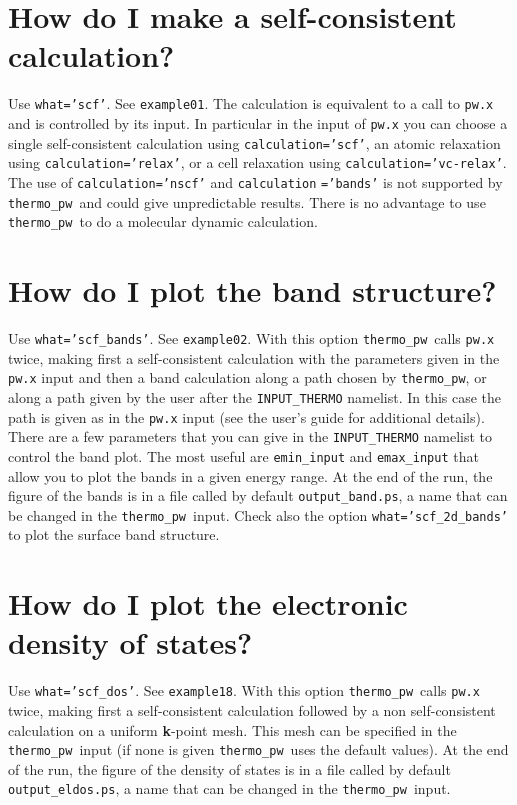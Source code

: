 \documentclass[12pt,a4paper]{article}
\def\thermo{\texttt{thermo\_pw}}
\begin{document}
\newpage
\section{\color{coral}How do I make a self-consistent calculation?}
Use \texttt{what='scf'}. See \texttt{example01}. The calculation is
equivalent to a call to \texttt{pw.x} and is controlled by
its input. In particular in the input of \texttt{pw.x} you can choose
a single self-consistent calculation using \texttt{calculation='scf'}, 
an atomic relaxation using \texttt{calculation='relax'}, or a cell relaxation 
using \texttt{calculation='vc-relax'}.
The use of \texttt{calculation='nscf'} and \texttt{calculation}
\texttt{='bands'} is
not supported by \thermo\ and could give unpredictable results.
There is no advantage to use \thermo\ to do a molecular dynamic
calculation. 

\newpage

\section{\color{coral}How do I plot the band structure?}
Use \texttt{what='scf\_bands'}. See \texttt{example02}.
With this option \thermo\ calls 
\texttt{pw.x} twice, making first a self-consistent calculation with 
the parameters
given in the \texttt{pw.x} input and then a band calculation along a 
path chosen by \thermo, or along a path given by the user
after the \texttt{INPUT\_THERMO} namelist. In this case the path is given as
in the \texttt{pw.x} input (see the user's guide for additional details).
There are a few parameters that you can give in the \texttt{INPUT\_THERMO} namelist to control the band plot. The most useful are 
\texttt{emin\_input} and \texttt{emax\_input} that allow you to plot the 
bands in a given energy range. At the end of the run, the figure of 
the bands is in a file called by default \texttt{output\_band.ps}, a name
that can be changed in the \thermo\ input.
Check also the option \texttt{what='scf\_2d\_bands'} 
to plot the surface band structure.
\newpage

\section{\color{coral}How do I plot the electronic density of states?}
Use \texttt{what='scf\_dos'}. See \texttt{example18}. With this option
\thermo\ calls \texttt{pw.x} twice, making first a self-consistent calculation
followed by a non self-consistent calculation on a uniform {\bf k}-point mesh.
This mesh can be specified in the \thermo\ input (if none is given \thermo\ 
uses the default values). At the end of the run, the figure of the density of
states is in a file called by default \texttt{output\_eldos.ps}, a name
that can be changed in the \thermo\ input.
\newpage
\end{document}
